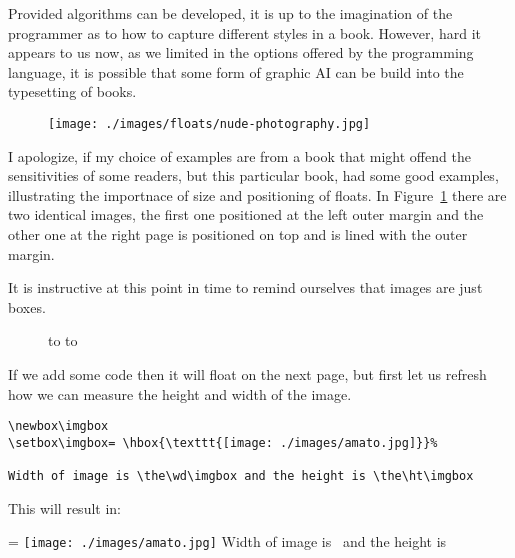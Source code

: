 Provided algorithms can be developed, it is up to the imagination of the programmer as to how to capture different styles in a book. However, hard it appears to us now, as we limited in the options offered by the programming language, it is possible that some form of graphic AI can be build into the typesetting of books.

\begin{figure}[htbp]
\bgroup
\parindent=0pt
\texttt{[image: ./images/floats/nude-photography.jpg]}

\caption{}

\label{fig:nude01}
\egroup
\end{figure}

I apologize, if my choice of examples are from a book that might offend the sensitivities of some readers, but this particular book, had some good examples, illustrating the importnace of size and positioning of floats. In Figure~\ref{fig:nude01} there are two identical images, the first one positioned at the left outer margin and the other one at the right page is positioned on top and is lined with the outer margin.


\lipsum[1-5]

It is instructive at this point in time to remind ourselves that images are just boxes.
\begin{figure}[!b]
\expandafter\ifodd\thepage\relax
  \hbox to 
\else
  \hbox to 
\fi
\end{figure}

If we add some code then it will float on the next page, but first let us refresh how we can measure the height and width of the image.
\newbox\imgbox
\begin{scriptexample}{}{}
\begin{verbatim}
\newbox\imgbox
\setbox\imgbox= \hbox{\texttt{[image: ./images/amato.jpg]}}%

Width of image is \the\wd\imgbox and the height is \the\ht\imgbox
\end{verbatim}
\end{scriptexample}

This will result in:

\begin{scriptexample}{}{}
\setbox\imgbox= \hbox{\texttt{[image: ./images/amato.jpg]}}%
Width of image is \the\wd\imgbox\ and the height is \the\ht\imgbox  
\end{scriptexample}

